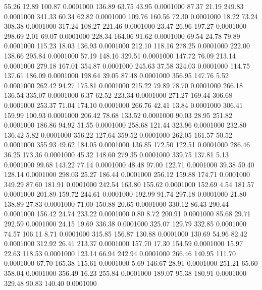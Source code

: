   55.26   12.89  100.87   0.0001000
 136.89   63.75   43.95   0.0001000
  87.37   21.19  249.83   0.0001000
 341.33   60.34   62.82   0.0001000
 109.76  160.56   72.30   0.0001000
  18.22   73.24  308.38   0.0001000
 317.24  108.27  221.46   0.0001000
  23.47   26.96  197.27   0.0001000
 298.69    2.01   69.07   0.0001000
 228.34  164.06   91.62   0.0001000
  69.54   24.78   79.89   0.0001000
 115.23   18.03  136.93   0.0001000
 212.10  118.16  278.25   0.0001000
 222.00  138.66  295.84   0.0001000
  57.19  148.16  329.51   0.0001000
 147.72   76.09  213.14   0.0001000
 279.18  167.01  354.87   0.0001000
 245.63   37.58  324.03   0.0001000
 114.75  137.61  186.09   0.0001000
 198.64   39.05   87.48   0.0001000
 356.95  147.76    5.52   0.0001000
 262.42   94.27  175.81   0.0001000
 215.22   79.89   78.70   0.0001000
 266.18  136.54  335.07   0.0001000
   6.37   62.52  223.34   0.0001000
 271.27  169.44  306.68   0.0001000
 253.37   71.04  174.10   0.0001000
 266.76   42.41   13.84   0.0001000
 306.41  159.99  100.93   0.0001000
 206.42   78.68  133.52   0.0001000
  90.03   28.95  251.82   0.0001000
 186.86   94.92   51.55   0.0001000
 258.68  121.44  323.96   0.0001000
 232.80  136.42    5.82   0.0001000
 356.22  127.64  359.52   0.0001000
 262.05  161.57   50.52   0.0001000
 355.93   49.62  184.05   0.0001000
 136.85  172.50  122.51   0.0001000
 286.46   36.25  173.36   0.0001000
  45.32  148.60  279.35   0.0001000
 339.75  137.81    5.13   0.0001000
  99.68  143.22   77.14   0.0001000
  48.48   97.00  122.71   0.0001000
  39.38   50.40  128.14   0.0001000
 298.03   25.27  186.44   0.0001000
 256.12  159.88  174.71   0.0001000
 349.29   87.60  181.91   0.0001000
 242.54  163.80  155.62   0.0001000
 152.69    4.54  181.57   0.0001000
 201.89  159.72  244.61   0.0001000
 192.99   91.74  297.18   0.0001000
  21.80  138.89   27.83   0.0001000
  71.00  150.88   20.65   0.0001000
 330.12   86.43  290.44   0.0001000
 156.42   24.74  233.22   0.0001000
   0.80    8.72  200.91   0.0001000
  85.68   29.71  292.59   0.0001000
  24.15   19.69  336.38   0.0001000
 325.07  129.79  332.85   0.0001000
  74.57  106.11    8.71   0.0001000
 315.85  156.87  130.88   0.0001000
 130.69   54.96   82.42   0.0001000
 312.92   26.41  213.37   0.0001000
 157.70   17.30  154.59   0.0001000
  15.97   22.63  118.53   0.0001000
 123.14   66.94  242.94   0.0001000
 266.46  140.95  111.70   0.0001000
  67.70  165.38  115.61   0.0001000
   5.69  146.67   28.91   0.0001000
 251.21   65.60  358.04   0.0001000
 356.49   16.23  255.84   0.0001000
 189.07   95.38  180.91   0.0001000
 329.48   90.83  140.40   0.0001000
